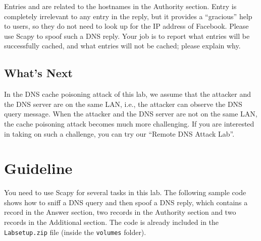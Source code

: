 Entries  and  are related to the hostnames in
the Authority section. Entry  is completely irrelevant to
any entry in the reply, but it provides a ``gracious'' help to
users, so they do not need to look up for the IP address
of Facebook. Please use Scapy to spoof such a DNS reply. Your job is
to report what entries will be successfully cached, and what entries will
not be cached; please explain why. 
 

\subsection{What's Next}


In the DNS cache poisoning attack of this lab, 
we assume that the attacker and the DNS server are on
the same LAN, i.e., the attacker can observe the DNS query message.
When the attacker and the DNS server are not on the same LAN,
the cache poisoning attack becomes much more challenging. If you
are interested in taking on such a challenge, you can 
try our ``Remote DNS Attack Lab''.




\section{Guideline}
\label{sec:guideline}


You need to use Scapy for several tasks in this lab. The following sample code shows how to
sniff a DNS query and then spoof a DNS reply, which contains 
a record in the Answer section, two records in the Authority section and two
records in the Additional section. The code is already included 
in the \texttt{Labsetup.zip} file (inside the \texttt{volumes} folder).  


